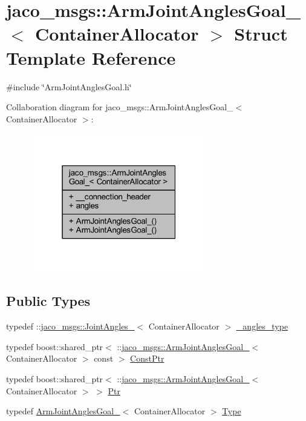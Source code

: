 \hypertarget{structjaco__msgs_1_1ArmJointAnglesGoal__}{}\section{jaco\+\_\+msgs\+:\+:Arm\+Joint\+Angles\+Goal\+\_\+$<$ Container\+Allocator $>$ Struct Template Reference}
\label{structjaco__msgs_1_1ArmJointAnglesGoal__}


{\ttfamily \#include \char`\"{}Arm\+Joint\+Angles\+Goal.\+h\char`\"{}}



Collaboration diagram for jaco\+\_\+msgs\+:\+:Arm\+Joint\+Angles\+Goal\+\_\+$<$ Container\+Allocator $>$\+:
\nopagebreak
\begin{figure}[H]
\begin{center}
\leavevmode
\includegraphics[width=220pt]{dc/d50/structjaco__msgs_1_1ArmJointAnglesGoal____coll__graph}
\end{center}
\end{figure}
\subsection*{Public Types}
\begin{DoxyCompactItemize}
\item 
typedef \+::\hyperlink{structjaco__msgs_1_1JointAngles__}{jaco\+\_\+msgs\+::\+Joint\+Angles\+\_\+}$<$ Container\+Allocator $>$ \hyperlink{structjaco__msgs_1_1ArmJointAnglesGoal___a426455ca4fced1b01435e33341594a89}{\+\_\+angles\+\_\+type}
\item 
typedef boost\+::shared\+\_\+ptr$<$ \+::\hyperlink{structjaco__msgs_1_1ArmJointAnglesGoal__}{jaco\+\_\+msgs\+::\+Arm\+Joint\+Angles\+Goal\+\_\+}$<$ Container\+Allocator $>$ const  $>$ \hyperlink{structjaco__msgs_1_1ArmJointAnglesGoal___abf158f2a2307be9fcece9beafd8ac487}{Const\+Ptr}
\item 
typedef boost\+::shared\+\_\+ptr$<$ \+::\hyperlink{structjaco__msgs_1_1ArmJointAnglesGoal__}{jaco\+\_\+msgs\+::\+Arm\+Joint\+Angles\+Goal\+\_\+}$<$ Container\+Allocator $>$ $>$ \hyperlink{structjaco__msgs_1_1ArmJointAnglesGoal___ab14f4b3081fbaa18adc43013e0250060}{Ptr}
\item 
typedef \hyperlink{structjaco__msgs_1_1ArmJointAnglesGoal__}{Arm\+Joint\+Angles\+Goal\+\_\+}$<$ Container\+Allocator $>$ \hyperlink{structjaco__msgs_1_1ArmJointAnglesGoal___a63cedcdc060ea3b4548bcac7ab947a94}{Type}
\end{DoxyCompactItemize}
